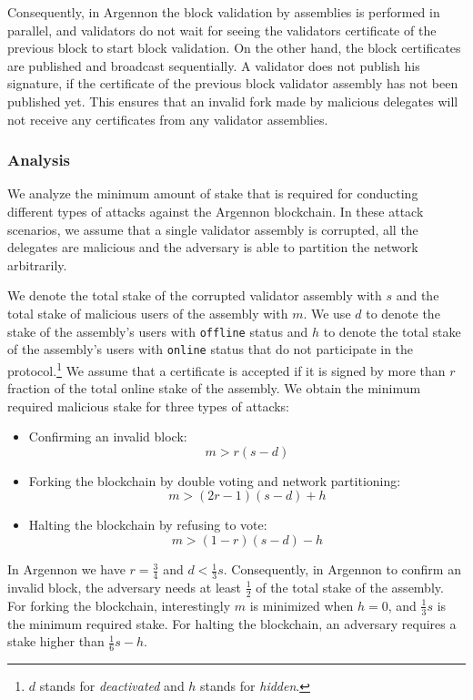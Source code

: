 Consequently, in Argennon the block validation by assemblies is performed in parallel, and validators
do not wait for seeing the validators certificate of the previous block to start block validation. On the
other hand, the block certificates are published and broadcast sequentially. A validator does not publish his
signature, if the certificate of the previous block validator assembly has not been published yet. This ensures that
an invalid fork made by malicious delegates will not receive any certificates from any validator assemblies.

\subsubsection{Analysis}

We analyze the minimum amount of stake that is required for conducting different types of attacks against the Argennon
blockchain. In these attack scenarios, we assume that a single validator assembly is corrupted, all the delegates
are malicious and the adversary is able to partition the network arbitrarily.

We denote the total stake of the corrupted validator assembly with $s$ and the total stake of malicious users of the
assembly with $m$. We use $d$ to denote the stake of the assembly's users with \texttt{offline} status and $h$ to denote
the total stake of the assembly's users with \texttt{online} status that do not participate in the
protocol.\footnote{$d$ stands for \emph{deactivated} and $h$ stands for \emph{hidden}.} We assume
that a certificate is accepted if it is signed by more than $r$ fraction of the total online stake of the assembly.
We obtain the minimum required malicious stake for three types of attacks:
\begin{itemize}
    \item Confirming an invalid block:
    \[ m > r(s-d) \]
    \item Forking the blockchain by double voting and network partitioning:
    \[m > (2r-1)(s-d)+h \]
    \item Halting the blockchain by refusing to vote:
    \[m > (1-r)(s-d)-h \]
\end{itemize}

In Argennon we have $r=\frac{3}{4}$ and $d < \frac{1}{3}s$.
Consequently, in Argennon to confirm an invalid block, the adversary needs at least $\frac{1}{2}$ of the total stake
of the assembly. For forking the blockchain, interestingly $m$ is
minimized when $h=0$, and $\frac{1}{3}s$ is the minimum required stake. For halting the blockchain,
an adversary requires a stake higher than $\frac{1}{6}s-h$.


